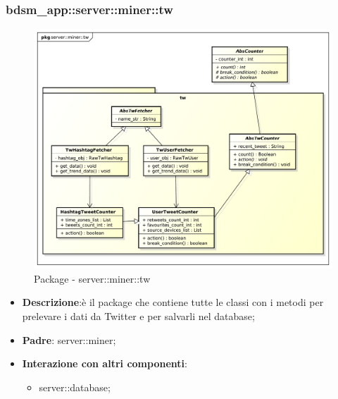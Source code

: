 \subsubsection{bdsm\_app::server::miner::tw} %
\label{ssub:bdsm_app_server_miner_tw}
\begin{figure}[htbp]
	\centering
	\centerline{\includegraphics[scale=0.4]{./images/server/miner_tw.pdf}}
	\caption{Package - server::miner::tw}
\end{figure}

\begin{itemize}
  \item \textbf{Descrizione}:è il package che contiene tutte le classi con i metodi per prelevare
i dati da Twitter e per salvarli nel database;
  \item \textbf{Padre}: server::miner;
  \item \textbf{Interazione con altri componenti}:
  	\begin{itemize}
  		\item server::database; 	
  	\end{itemize}
\end{itemize}	

